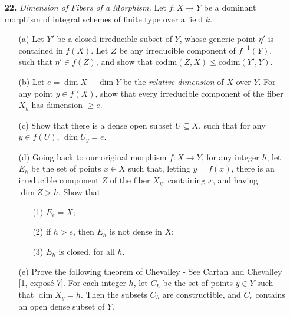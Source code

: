 \documentclass{article}
\newcommand{\goth}[1]{\textfrak{#1}}
\begin{document}
\begin{enumerate} [label=\textbf{\arabic*.}, leftmargin=0em]
\begin{proof}

\end{proof}

\item[\textbf{22.}] \textit{Dimension of Fibers of a Morphism.} Let $f : X \to Y$ be a dominant morphism of integral schemes of finite type over a field $k$.
\begin{itemize} [leftmargin=0cm]
    \item[(a)] Let $Y'$ be a closed irreducible subset of $Y$, whose generic point $\eta'$ is contained in $f(X)$. Let $Z$ be any irreducible component of $f^{-1}(Y)$, such that $\eta' \in f(Z)$, and show that $\text{codim}(Z, X) \leq \text{codim}(Y', Y)$.
    \item[(b)] Let $e = \dim{X} - \dim{Y}$ be the \textit{relative dimension} of $X$ over $Y$. For any point $y \in f(X)$, show that every irreducible component of the fiber $X_y$ has dimension $\geq e$. 
    \item[(c)] Show that there is a dense open subset $U \subseteq X$, such that for any $y \in f(U)$, $\dim{U_y} = e$.
    \item[(d)] Going back to our original morphism $f : X \to Y$, for any integer $h$, let $E_h$ be the set of points $x \in X$ such that, letting $y = f(x)$, there is an irreducible component $Z$ of the fiber $X_y$, containing $x$, and having $\dim{Z} > h$. Show that
    \begin{itemize}
        \item[(1)] $E_e = X$;
        \item[(2)] if $h > e$, then $E_h$ is not dense in $X$;
        \item[(3)] $E_h$ is closed, for all $h$.
    \end{itemize}
    \item[(e)] Prove the following theorem of Chevalley - See Cartan and Chevalley [1, exposé 7]. For each integer $h$, let $C_h$ be the set of points $y \in Y$ such that $\dim{X_y} = h$. Then the subsets $C_h$ are constructible, and $C_e$ contains an open dense subset of $Y$.
\end{itemize}

\end{enumerate}
\end{document}
